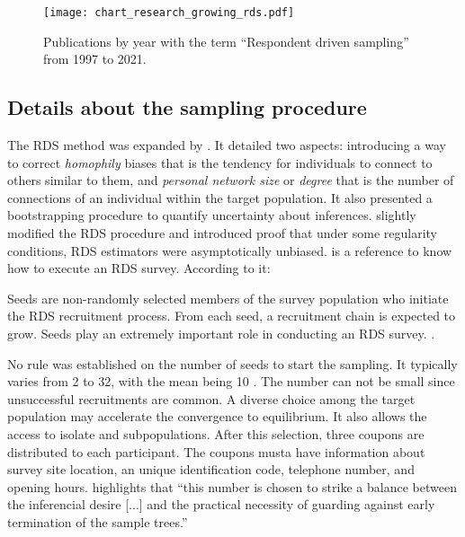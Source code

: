 \begin{figure}
  \centering  
  \caption{\label{fig:chart-research-rds}Publications by year with the term
  ``Respondent driven sampling'' from 1997 to 2021.}
  \texttt{[image: chart\_research\_growing\_rds.pdf]}
\end{figure}

\subsection{Details about the sampling procedure}
\label{sec:sampling-procedure}

The RDS method was expanded by \textcite{heckathorn2002}. It detailed two aspects: 
introducing a way to correct {\em homophily} biases that is the tendency for
individuals to connect to others similar to them, and {\em personal network size} or
{\em degree} that is the number of connections of an individual within the
target population. It also presented a bootstrapping procedure to quantify
uncertainty about inferences. \textcite{salganik2004sampling} slightly modified the
RDS procedure and introduced proof that under some regularity conditions, RDS
estimators were asymptotically unbiased. \textcite{world2013introduction}
is a reference to know how to execute an RDS survey. According to it: 

\begin{citacao}
  Seeds are non-randomly selected members of the survey population who initiate the RDS
  recruitment process. From each seed, a recruitment chain is expected to grow. Seeds play
  an extremely important role in conducting an RDS survey. \cite[p. 70]{world2013introduction}.
\end{citacao}

No rule was established on the number of seeds to start the sampling. It
typically varies from 2 to 32, with the mean being 10 \cite[p. 70]{world2013introduction}. The number can not be
small since unsuccessful recruitments are common. A diverse choice among the
target population may accelerate the convergence to equilibrium. It also
allows the access to isolate and subpopulations. After this selection, three
coupons are distributed to each participant. The coupons musta have
information about survey site location, an unique identification code,
telephone number, and opening hours. \textcite[p. 67]{gile2018methods}
highlights that ``this number is chosen to strike a balance between the
inferencial desire [...] and the practical necessity of guarding against early
termination of the sample trees.'' 

